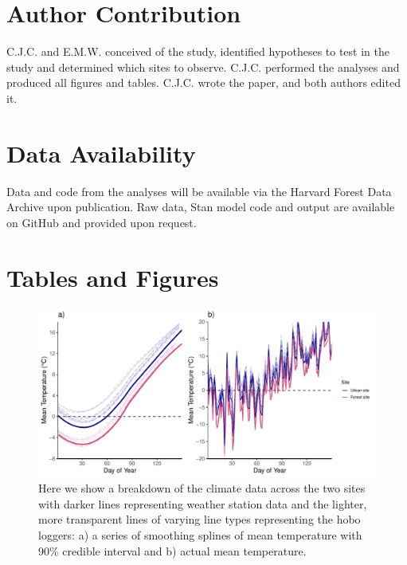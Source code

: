 \documentclass{article}\usepackage[]{graphicx}\usepackage[]{color}
\begin{document}
\section*{Author Contribution} 
C.J.C. and E.M.W. conceived of the study, identified hypotheses to test in the study and determined which sites to observe. C.J.C. performed the analyses and produced all figures and tables. C.J.C. wrote the paper, and both authors edited it.

\section*{Data Availability}
Data and code from the analyses will be available via the Harvard Forest Data Archive upon publication. Raw data, {Stan} model code and output are available on GitHub and provided upon request.




\section*{Tables and Figures}

{\begin{figure} [H]
  \begin{center}
  \includegraphics[width=16cm]{..//analyses/figures/climate_smooth&daily.pdf}
  \caption{Here we show a breakdown of the climate data across the two sites with darker lines representing weather station data and the lighter, more transparent lines of varying line types representing the hobo loggers: a) a series of smoothing splines of mean temperature with 90\% credible interval and b) actual mean temperature.}\label{fig:clim}
  \end{center}
  \end{figure}}
  
\end{document}
